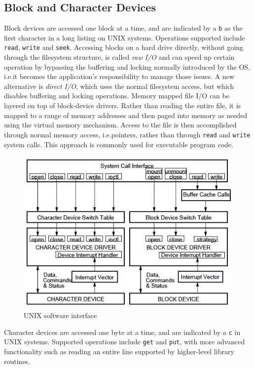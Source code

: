 \subsection{Block and Character Devices}
Block devices are accessed one block at a time, and are indicated by a \texttt{b} as the first character in a long listing on UNIX systems. Operations supported include \texttt{read}, \texttt{write} and \texttt{seek}. Accessing blocks on a hard drive directly, without going through the filesystem structure, is called \emph{raw I/O} and can speed up certain operation by bypassing the buffering and locking normally introduced by the OS, i.e.\@ it becomes the application's responsibility to manage those issues. A new alternative is \emph{direct I/O}, which uses the normal filesystem access, but which disables buffering and locking operations. Memory mapped file I/O can be layered on top of block-device drivers. Rather than reading the entire file, it is mapped to a range of memory addresses and then paged into memory as needed using the virtual memory mechanism. Access to the file is then accomplished through normal memory access, i.e.\@ pointers, rather than through \texttt{read} and \texttt{write} system calls. This approach is commonly used for executable program code.

\begin{figure}[hbtp]
\centering
\includegraphics[scale=0.4]{images/device_management/unix_sw_interface.jpg}
\caption{UNIX software interface}
\end{figure}

Character devices are accessed one byte at a time, and are indicated by a \texttt{c} in UNIX systems. Supported operations include \texttt{get} and \texttt{put}, with more advanced functionality such as reading an entire line supported by higher-level library routines.

